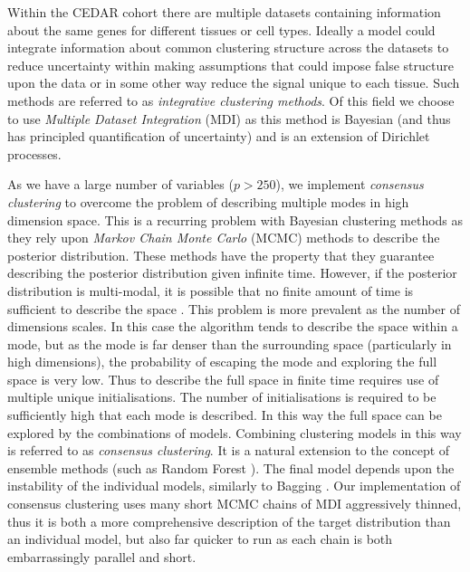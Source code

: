 \documentclass[12pt]{article} %
\begin{document}
	Within the CEDAR cohort there are multiple datasets containing information about the same genes for different tissues or cell types. Ideally a model could integrate information about common clustering structure across the datasets to reduce uncertainty within making assumptions that could impose false structure upon the data or in some other way reduce the signal unique to each tissue. Such methods are referred to as \emph{integrative clustering methods}. Of this field we choose to use \emph{Multiple Dataset Integration} (MDI) \cite{KirkBayesiancorrelatedclustering2012} as this method is Bayesian (and thus has principled quantification of uncertainty) and is an extension of Dirichlet processes.
	
	As we have a large number of variables ($p > 250$), we implement \emph{consensus clustering} to overcome the problem of describing multiple modes in high dimension space. This is a recurring problem with Bayesian clustering methods as they rely upon \emph{Markov Chain Monte Carlo} (MCMC) methods to describe the posterior distribution. These methods have the property that they guarantee describing the posterior distribution given infinite time. However, if the posterior distribution is multi-modal, it is possible that no finite amount of time is sufficient to describe the space \cite{TjelmelandModeJumpingProposals2001}. This problem is more prevalent as the number of dimensions scales. In this case the algorithm tends to describe the space within a mode, but as the mode is far denser than the surrounding space (particularly in high dimensions), the probability of escaping the mode and exploring the full space is very low. Thus to describe the full space in finite time requires use of multiple unique initialisations. The number of initialisations is required to be sufficiently high that each mode is described. In this way the full space can be explored by the combinations of models. Combining clustering models in this way is referred to as \emph{consensus clustering}. It is a natural extension to the concept of ensemble methods (such as Random Forest \cite{BreimanRandomForests1}). The final model depends upon the instability of the individual models, similarly to Bagging \cite{BreimanBaggingpredictors1996}. Our implementation of consensus clustering uses many short MCMC chains of MDI aggressively thinned, thus it is both a more comprehensive description of the target distribution than an individual model, but also far quicker to run as each chain is both embarrassingly parallel and short.
	
\end{document}
